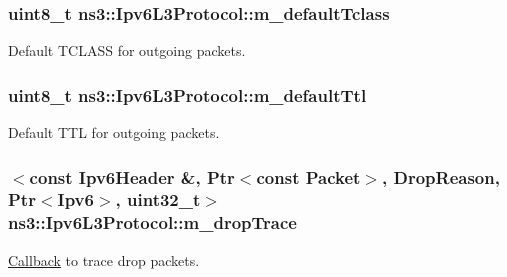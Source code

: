 \subsubsection[{\texorpdfstring{m\+\_\+default\+Tclass}{m_defaultTclass}}]{\setlength{\rightskip}{0pt plus 5cm}uint8\+\_\+t ns3\+::\+Ipv6\+L3\+Protocol\+::m\+\_\+default\+Tclass\hspace{0.3cm}{\ttfamily [private]}}\hypertarget{classns3_1_1Ipv6L3Protocol_a0ead80eb6fa685c54dc155dff9157345}{}\label{classns3_1_1Ipv6L3Protocol_a0ead80eb6fa685c54dc155dff9157345}


Default T\+C\+L\+A\+SS for outgoing packets. 

\subsubsection[{\texorpdfstring{m\+\_\+default\+Ttl}{m_defaultTtl}}]{\setlength{\rightskip}{0pt plus 5cm}uint8\+\_\+t ns3\+::\+Ipv6\+L3\+Protocol\+::m\+\_\+default\+Ttl\hspace{0.3cm}{\ttfamily [private]}}\hypertarget{classns3_1_1Ipv6L3Protocol_a2857858d48a3ce4f6bc1912d721825b7}{}\label{classns3_1_1Ipv6L3Protocol_a2857858d48a3ce4f6bc1912d721825b7}


Default T\+TL for outgoing packets. 

\subsubsection[{\texorpdfstring{m\+\_\+drop\+Trace}{m_dropTrace}}]{$<$const {\bf Ipv6\+Header} \&, {\bf Ptr}$<$const {\bf Packet}$>$, {\bf Drop\+Reason}, {\bf Ptr}$<${\bf Ipv6}$>$, uint32\+\_\+t$>$ ns3\+::\+Ipv6\+L3\+Protocol\+::m\+\_\+drop\+Trace\hspace{0.3cm}{\ttfamily [private]}}\hypertarget{classns3_1_1Ipv6L3Protocol_ac22d2d63cac436267ae6cafc46880a6e}{}\label{classns3_1_1Ipv6L3Protocol_ac22d2d63cac436267ae6cafc46880a6e}


\hyperlink{classns3_1_1Callback}{Callback} to trace drop packets. 

